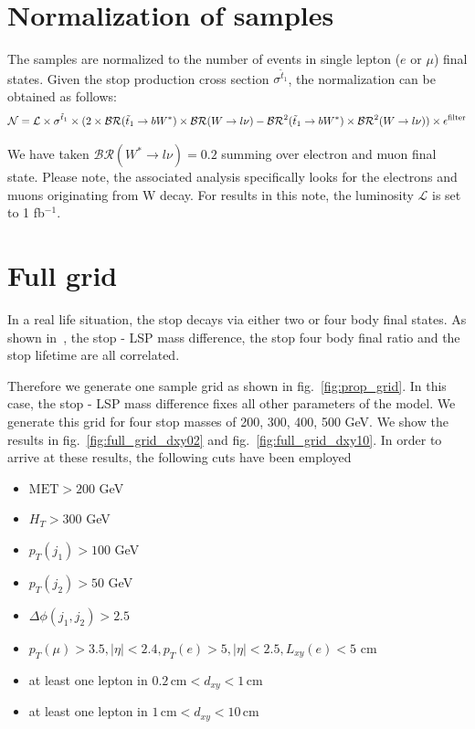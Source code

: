 \documentclass[prd,reprint,nofootinbib,notitlepage,aps,tightenlines,amsmath,amssymb,showpacs,superscriptaddress]{revtex4-1}
\begin{document}
\section{Normalization of samples}
The samples are normalized to the number of events in single lepton ($e$ or $\mu$) final states. Given the stop production cross section $\sigma^{\tilde t_1}$, the normalization can be obtained as follows: 
\begin{equation}
    \mathcal{N} = \mathcal{L}\times \sigma^{\tilde t_1}\times(2\times\mathcal{BR}(\tilde t_1 \rightarrow b W^*) \times\mathcal{BR}(W\rightarrow l \nu) - \mathcal{BR}^2(\tilde t_1 \rightarrow b W^*) \times\mathcal{BR}^2(W\rightarrow l \nu))\times \epsilon^{\rm{filter}}
\end{equation}

We have taken $\mathcal{BR}(W^*\rightarrow l \nu) = 0.2$ summing over electron and muon final state. Please note, the associated analysis specifically looks for the electrons and muons originating from W decay. For results in this note, the luminosity $\mathcal{L}$ is set to 1 fb$^{-1}$. 
\section{Full grid}
In a real life situation, the stop decays via either two or four body final states. As shown in~\cite{Grober:2014aha}, the stop - LSP mass difference, the stop four body final ratio and the stop lifetime are all correlated. 

Therefore we generate one sample grid as shown in fig.~\ref{fig:prop_grid}. In this case, the stop - LSP mass difference fixes all other parameters of the model. We generate this grid for four stop masses of 200, 300, 400, 500 GeV. We show the results in fig.~\ref{fig:full_grid_dxy02} and fig.~\ref{fig:full_grid_dxy10}. In order to arrive at these results, the following cuts have been employed
\begin{itemize}
    \item $\textrm{MET} > 200 $ GeV
    \item $H_T > 300$ GeV
    \item $p_T(j_1) > 100 $ GeV 
    \item $p_T(j_2) > 50 $ GeV 
    \item $\Delta \phi(j_1, j_2) > 2.5$
    \item $p_T(\mu) > 3.5, |\eta| < 2.4, p_T(e) > 5, |\eta| < 2.5, L_{xy}(e) < 5$ cm
    \item at least one lepton in $0.2\, \textrm{cm} < d_{xy} < 1\, \textrm{cm} $
    \item at least one lepton in $1\, \textrm{cm} < d_{xy} < 10\, \textrm{cm} $
\end{itemize}
\end{document}
